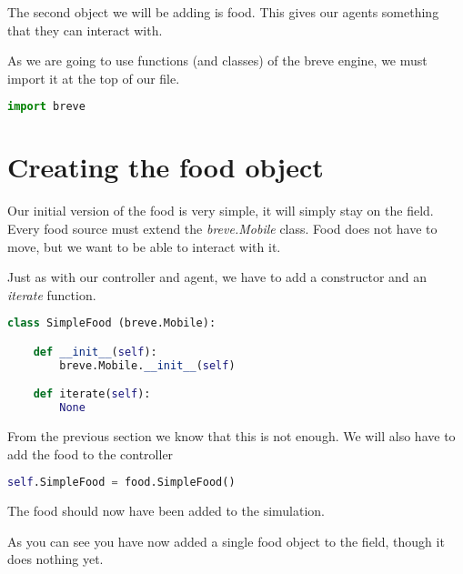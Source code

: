 The second object we will be adding is food. This gives our agents something that they can interact with.


As we are going to use functions (and classes) of the breve engine, we must import it at the top of our file.

\begin{lstlisting}[language=Python]
import breve
\end{lstlisting}


\section{Creating the food object}

Our initial version of the food is very simple, it will simply stay on the field. Every food source must extend the \textit{breve.Mobile} class. Food does not have to move, but we want to be able to interact with it.

Just as with our controller and agent, we have to add a constructor and an \textit{iterate} function.

\begin{lstlisting}[language=Python]
class SimpleFood (breve.Mobile):

    def __init__(self):
        breve.Mobile.__init__(self)

    def iterate(self):
        None
\end{lstlisting}


From the previous section we know that this is not enough. We will also have to add the food to the controller

\begin{lstlisting}[language=Python]
self.SimpleFood = food.SimpleFood()
\end{lstlisting}


The food should now have been added to the simulation.


As you can see you have now added a single food object to the field, though it does nothing yet.

